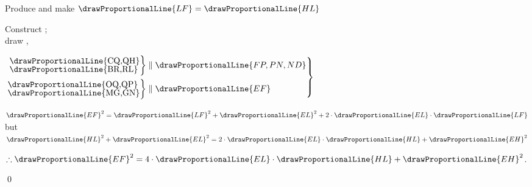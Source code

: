 \documentclass[booklanguage=english]{byrnebook}
\begin{document}
\begin{center}
Produce  and make $\drawProportionalLine{LF} = \drawProportionalLine{HL}$

Construct  ;\\
draw ,

$\left.
\begin{aligned}
\left.
	\begin{aligned}
		\vcenter{
		\nointerlineskip\hbox{\drawProportionalLine{CQ,QH}}
		\nointerlineskip\hbox{\drawProportionalLine{BR,RL}}
		}
	\end{aligned}\right\} & \parallel \drawProportionalLine{FP,PN,ND}\\
\left.
	\begin{aligned}
		\vcenter{
		\nointerlineskip\hbox{\drawProportionalLine{OQ,QP}}
		\nointerlineskip\hbox{\drawProportionalLine{MG,GN}}
		}
	\end{aligned}
\right\} & \parallel \drawProportionalLine{EF}\\
\end{aligned}
\right\}$ 

$\drawProportionalLine{EF}^2 = \drawProportionalLine{LF}^2 + \drawProportionalLine{EL}^2 + 2 \cdot \drawProportionalLine{EL} \cdot \drawProportionalLine{LF}$ \\
but $\drawProportionalLine{HL}^2 + \drawProportionalLine{EL}^2 = 2 \cdot \drawProportionalLine{EL} \cdot \drawProportionalLine{HL} + \drawProportionalLine{EH}^2$ 

$\therefore \drawProportionalLine{EF}^2 = 4 \cdot \drawProportionalLine{EL} \cdot \drawProportionalLine{HL} + \drawProportionalLine{EH}^2$.
\end{center}

\qed
\end{document}
